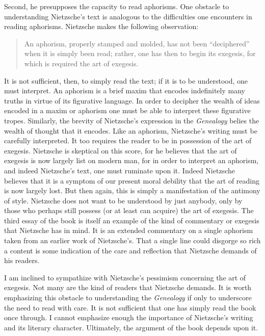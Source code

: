 Second, he presupposes the capacity to read aphorisms. One obstacle to understanding Nietzsche's text is analogous to the difficulties one encounters in reading aphorisms. Nietzsche makes the following observation:
\begin{quote}
    An aphorism, properly stamped and molded, has not been ``deciphered'' when it is simply been read; rather, one has then to begin its exegesis, for which is required the art of exegesis.
\end{quote}
It is not sufficient, then, to simply read the text; if it is to be understood, one must interpret. An aphorism is a brief maxim that encodes indefinitely many truths in virtue of its figurative language. In order to decipher the wealth of ideas encoded in a maxim or aphorism one must be able to interpret these figurative tropes. Similarly, the brevity of Nietzsche's expression in the \emph{Genealogy} belies the wealth of thought that it encodes. Like an aphorism, Nietzsche's writing must be carefully interpreted. It too requires the reader to be in possession of the art of exegesis. Nietzsche is skeptical on this score, for he believes that the art of exegesis is now largely list on modern man, for in order to interpret an aphorism, and indeed Nietzsche's text, one must ruminate upon it. Indeed Nietzsche believes that it is a symptom of our present moral debility that the art of reading is now largely lost. But then again, this is simply a manifestation of the antimony of style. Nietzsche does not want to be understood by just anybody, only by those who perhaps still possess (or at least can acquire) the art of exegesis. The third essay of the book is itself an example of the kind of commentary or exegesis that Nietzsche has in mind. It is an extended commentary on a single aphorism taken from an earlier work of Nietzsche's. That a single line could disgorge so rich a content is some indication of the care and reflection that Nietzsche demands of his readers.

I am inclined to sympathize with Nietzsche's pessimism concerning the art of exegesis. Not many are the kind of readers that Nietzsche demands. It is worth emphasizing this obstacle to understanding the \emph{Genealogy} if only to underscore the need to read with care. It is not sufficient that one has simply read the book once through. I cannot emphasize enough the importance of Nietzsche's writing and its literary character. Ultimately, the argument of the book depends upon it. \change

